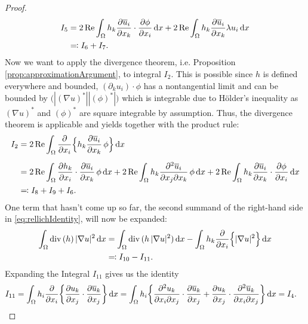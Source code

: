 \begin{proof}
\begin{align*}
     I_5 
     &= 2 \operatorname{Re} \int_\Omega h_k \frac{\partial \overline u_i}{\partial x_k}\cdot  \frac{\partial \phi}{\partial x_i} \, {\operatorname{d}\!{x}} + 2\operatorname{Re} \int_\Omega h_k \frac{\partial\overline u_i}{\partial x_k} \lambda u_i \, {\operatorname{d}\!{x}} \\
     &\eqqcolon I_6 + I_7 .
  \end{align*}
  Now we want to apply the divergence theorem, i.e. Proposition \ref{prop:approximationArgument}, to integral $I_2$.
  This is possible since $h$ is defined everywhere and bounded, $(\partial_k u_i) \cdot \phi$ has a nontangential limit and can be bounded by $\big( |(\nabla u)^*| |(\phi)^*| \big)$ which is integrable due to Hölder's inequality as $(\nabla u)^*$ and $(\phi)^*$ are square integrable by assumption.
  Thus, the divergence theorem is applicable and yields together with the product rule:
  \begin{align*}
    I_2
    &= 2 \operatorname{Re} \int_\Omega \frac{\partial}{\partial x_i} \Big\{ h_k \frac{\partial \overline u_i}{\partial x_k} \, \phi \Big\} \, {\operatorname{d}\!{x}} \\[0.5em]
    &= 2 \operatorname{Re} \int_\Omega \frac{\partial h_k}{\partial x_i} \cdot \frac{\partial \overline u_i}{\partial x_k} \, \phi \, {\operatorname{d}\!{x}} + 2 \operatorname{Re} \int_\Omega h_k \frac{\partial^2 \overline u_i}{\partial x_j \partial x_k} \, \phi \, {\operatorname{d}\!{x}} + 2 \operatorname{Re} \int_\Omega h_k \frac{\partial \overline u_i}{\partial x_k} \cdot \frac{\partial \phi}{\partial x_i} \, {\operatorname{d}\!{x}}\\
    &\eqqcolon I_8 + I_9 + I_6.
  \end{align*}
  One term that hasn't come up so far, the second summand of the right-hand side in \eqref{eq:rellichIdentity}, will now be expanded:
  \begin{align*}
    \int_\Omega \mathrm{div\,} (h)\,  |\nabla u|^2 \, {\operatorname{d}\!{x}}
    &= \int_\Omega \mathrm{div\,} ( h\,|\nabla u|^2) \, {\operatorname{d}\!{x}} - \int_\Omega h_k \frac{\partial}{\partial x_i} \Big\{ |\nabla u|^2 \Big\} \, {\operatorname{d}\!{x}} \\
    &\eqqcolon I_{10} - I_{11}.
  \end{align*}
  Expanding the Integral $I_{11}$ gives us the identity
  \begin{align*}
    I_{11}
    &= \int_\Omega h_i \frac{\partial}{\partial x_i} \bigg\{ \frac{\partial u_k}{\partial x_j} \cdot \frac{\partial \overline u_k}{\partial x_j} \bigg\} \, {\operatorname{d}\!{x}}
    = \int_\Omega h_i  \bigg\{ \frac{\partial^2 u_k}{\partial x_i \partial x_j} \cdot \frac{\partial \overline u_k}{\partial x_j} + \frac{\partial u_k}{\partial x_j} \cdot \frac{\partial^2 \overline u_k}{\partial x_i \partial x_j} \bigg\} \, {\operatorname{d}\!{x}}= I_4.
  \end{align*}

\end{proof}
